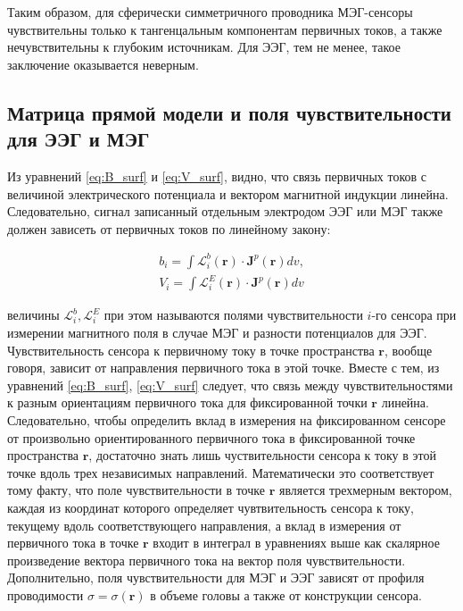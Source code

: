 Таким образом, для сферически симметричного проводника МЭГ-сенсоры чувствительны
только к тангенцальным компонентам первичных токов, а также нечувствительны к глубоким источникам.
Для ЭЭГ, тем не менее, такое заключение оказывается неверным.


\subsection{Матрица прямой модели и поля чувствительности для ЭЭГ и МЭГ}
Из уравнений \ref{eq:B_surf} и \ref{eq:V_surf}, видно, что связь первичных токов с величиной электрического
потенциала и вектором магнитной индукции линейна. Следовательно, сигнал записанный отдельным
электродом ЭЭГ или МЭГ также должен зависеть от первичных токов по линейному закону:

\begin{gather}
    b_i = \int \mathbf{\mathcal{L}}_i^b(\mathbf{r}) \cdot \mathbf{J}^p(\mathbf{r})dv, \\
    V_i = \int \mathbf{\mathcal{L}}_i^E(\mathbf{r}) \cdot \mathbf{J}^p(\mathbf{r})dv
    \label{eq:lf_int}
\end{gather}

величины $\mathbf{\mathcal{L}}_i^b, \mathbf{\mathcal{L}}_i^E$
при этом называются полями чувствительности $i$-го сенсора при измерении магнитного поля
в случае МЭГ и разности потенциалов для ЭЭГ. Чувствительность сенсора к первичному току
в точке пространства $\mathbf{r}$, вообще говоря, зависит от направления первичного тока в этой точке.
Вместе с тем, из уравнений \ref{eq:B_surf}, \ref{eq:V_surf} следует, что связь между чувствительностями
к разным ориентациям первичного тока для фиксированной точки $\mathbf{r}$ линейна. Следовательно,
чтобы определить вклад в измерения на фиксированном сенсоре от произвольно ориентированного первичного тока
в фиксированной точке пространства $\mathbf{r}$,
достаточно знать лишь чуствительности сенсора к току в этой точке вдоль трех независимых направлений.
Математически это соответствует тому факту, что поле чувствительности в точке $\mathbf{r}$ является
трехмерным вектором, каждая из координат которого определяет чувтвительность сенсора к току, текущему
вдоль соответствующего направления, а вклад в измерения от первичного тока в точке $\mathbf{r}$
входит в интеграл в уравнениях выше как скалярное произведение вектора первичного тока на вектор
поля чувствительности.
Дополнительно, поля чувствительности для МЭГ и ЭЭГ зависят от профиля проводимости $\sigma=\sigma(\mathbf{r})$
в объеме головы а также от конструкции сенсора.

